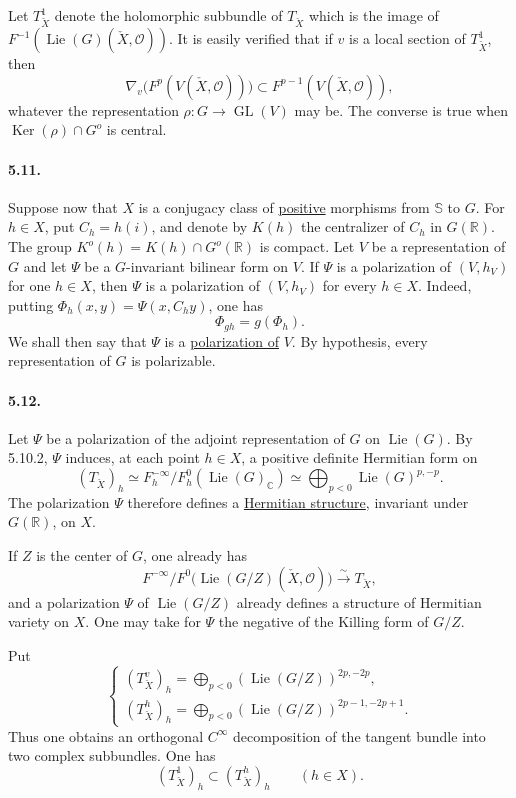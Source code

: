\documentclass[10pt,leqno]{article}
\newcommand{\C}{\mathbb C}
\newcommand{\R}{\mathbb R}
\newcommand{\bS}{\mathbb S}
\newcommand{\cO}{\mathcal O}
\newcommand{\Ker}{\operatorname{Ker}}
\theoremstyle{deligne}
\newcommand{\Lie}{\operatorname{Lie}}
\newcommand{\GL}{\operatorname{GL}}
\renewcommand{\underline}[1]{\uline{#1}}
\begin{document}
Let $T^1_{\check X}$ denote the holomorphic subbundle of $T_{\check X}$ which is the image of $F^{-1}(\Lie(G)(\check X,\cO))$. It is easily verified that if $v$ is a local section of $T^1_{\check X}$, then
\[
  \nabla_v\bigl(F^p(V(\check X,\cO))\bigr)
  \subset F^{p-1}(V(\check X,\cO)),
\]
whatever the representation $\rho:G\to\GL(V)$ may be. The converse is true when $\Ker(\rho)\cap G^o$ is central.

\paragraph{5.11.}
Suppose now that $X$ is a conjugacy class of \underline{positive} morphisms from $\bS$ to $G$. For $h\in X$, put $C_h=h(i)$, and denote by $K(h)$ the centralizer of $C_h$ in $G(\R)$. The group $K^o(h)=K(h)\cap G^o(\R)$ is compact. Let $V$ be a representation of $G$ and let $\Psi$ be a $G$-invariant bilinear form on $V$. If $\Psi$ is a polarization of $(V,h_V)$ for one $h\in X$, then $\Psi$ is a polarization of $(V,h_V)$ for every $h\in X$. Indeed, putting $\Phi_h(x,y)=\Psi(x,C_hy)$, one has
\[
\tag{5.11.1}
  \Phi_{gh}=g(\Phi_h).
\]
We shall then say that $\Psi$ is a \underline{polarization of} $V$. By hypothesis, every representation of $G$ is polarizable.

\paragraph{5.12.}
Let $\Psi$ be a polarization of the adjoint representation of $G$ on $\Lie(G)$. By 5.10.2, $\Psi$ induces, at each point $h\in X$, a positive definite Hermitian form on
\[
\tag{5.12.1}
  (T_{\check X})_h
  \simeq
  F_h^{-\infty}/F_h^0(\Lie(G)_\C)
  \simeq
  \bigoplus_{p<0}\Lie(G)^{p,-p}.
\]
The polarization $\Psi$ therefore defines a \underline{Hermitian structure}, invariant under $G(\R)$, on $X$.

If $Z$ is the center of $G$, one already has
\[
\tag{5.12.2}
  F^{-\infty}/F^0\bigl(\Lie(G/Z)(\check X,\cO)\bigr)
  \xrightarrow{\sim} T_{\check X},
\]
and a polarization $\Psi$ of $\Lie(G/Z)$ already defines a structure of Hermitian variety on $X$. One may take for $\Psi$ the negative of the Killing form of $G/Z$.

Put
\[
\tag{5.12.3}
\begin{cases}
 (T_{\check X}^v)_h=\displaystyle\bigoplus_{p<0}(\Lie(G/Z))^{2p,-2p},\\[0.4em]
 (T_{\check X}^h)_h=\displaystyle\bigoplus_{p<0}(\Lie(G/Z))^{2p-1,-2p+1}.
\end{cases}
\]
Thus one obtains an orthogonal $C^\infty$ decomposition of the tangent bundle into two complex subbundles. One has
\[
\tag{5.12.4}
  (T_{\check X}^1)_h\subset (T_{\check X}^h)_h \qquad (h\in X).
\]
\end{document}
